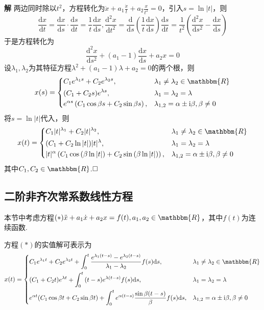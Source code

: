 \documentclass{ctexart}
\newenvironment{custom}[1]{\par\noindent \textbf{#1}\quad}{\par\vspace{1em}}
\begin{document}
\begin{custom}{解}
两边同时除以$t^{2}$，方程转化为$\ddot{x}+a_{1}\frac{\dot{x}}{t}+a_{2}\frac{x}{t^{2}}=0$，引入$s=\ln{|t|}$，则
$$\frac{\mathrm{d}x}{\mathrm{d}t}=\frac{\mathrm{d}x}{\mathrm{d}s}\cdot\frac{\mathrm{d}s}{\mathrm{d}t}=\frac{1}{t}\frac{\mathrm{d}x}{\mathrm{d}s},\frac{\mathrm{d}^{2}x}{\mathrm{d}t^{2}}=\frac{\mathrm{d}}{\mathrm{d}s}\left(\frac{1}{t}\frac{\mathrm{d}x}{\mathrm{d}s}\right)\frac{\mathrm{d}s}{\mathrm{d}t}=\frac{1}{t^{2}}\left(\frac{\mathrm{d}^{2}x}{\mathrm{d}s^{2}}-\frac{\mathrm{d}x}{\mathrm{d}s}\right)$$
于是方程转化为
$$\frac{\mathrm{d}^{2}x}{\mathrm{d}s^{2}}+(a_{1}-1)\frac{\mathrm{d}x}{\mathrm{d}s}+a_{2}x=0$$
设$\lambda_{1},\lambda_{2}$为其特征方程$\lambda^{2}+(a_{1}-1)\lambda+a_{2}=0$的两个根，则
$$x(s)=\left\{\begin{aligned}&C_{1}e^{\lambda_{1}s}+C_{2}e^{\lambda_{2}s},&&\lambda_{1}\neq \lambda_{2}\in\mathbbm{R}\\&(C_{1}+C_{2}s)e^{\lambda s},&&\lambda_{1}=\lambda_{2}=\lambda\\&e^{\alpha s}\left(C_{1}\cos{\beta s}+C_{2}\sin{\beta s}\right),&&\lambda_{1,2}=\alpha\pm\mathrm{i}\beta,\beta\neq 0\\\end{aligned}\right.$$
将$s=\ln{|t|}$代入，则
$$x(t)=\left\{\begin{aligned}&C_{1}|t|^{\lambda_{1}}+C_{2}|t|^{\lambda_{2}},&&\lambda_{1}\neq \lambda_{2}\in\mathbbm{R}\\&(C_{1}+C_{2}\ln{|t|})|t|^{\lambda},&&\lambda_{1}=\lambda_{2}=\lambda\\&|t|^{\alpha }\left(C_{1}\cos{\left(\beta \ln{|t|}\right)}+C_{2}\sin{\left(\beta \ln{|t|}\right)}\right),&&\lambda_{1,2}=\alpha\pm\mathrm{i}\beta,\beta\neq 0\\\end{aligned}\right.$$
其中$C_{1},C_{2}\in\mathbbm{R}$.$\hfill{\square}$
\end{custom}

\subsection{二阶非齐次常系数线性方程}
本节中考虑方程$(*)\ddot{x}+a_{1}\dot{x}+a_{2}x=f(t),a_{1},a_{2}\in\mathbbm{R}$，其中$f(t)$为连续函数.
\begin{theorem}[二阶非齐次常系数线性方程的实值解]
方程$(*)$的实值解可表示为
$$x(t)=\left\{\begin{aligned}&C_{1}e^{\lambda_{1}t}+C_{2}e^{\lambda_{2}t}+\int_{0}^{t}{\frac{e^{\lambda_{1}(t-s)}-e^{\lambda_{2}(t-s)}}{\lambda_{1}-\lambda_{2}}f(s)\mathrm{d}s},&&\lambda_{1}\neq \lambda_{2}\in\mathbbm{R}\\&(C_{1}+C_{2}t)e^{\lambda t}+\int_{0}^{t}{(t-s)e^{\lambda(t-s)}f(s)\mathrm{d}s},&&\lambda_{1}=\lambda_{2}=\lambda\\&e^{\alpha t}(C_{1}\cos{\beta t}+C_{2}\sin{\beta t})+\int_{0}^{t}{e^{\alpha(t-s)}\frac{\sin{\beta(t-s)}}{\beta}f(s)\mathrm{d}s},&&\lambda_{1,2}=\alpha\pm\mathrm{i}\beta,\beta\neq 0\\\end{aligned}\right.$$
\end{theorem}
\end{document}
